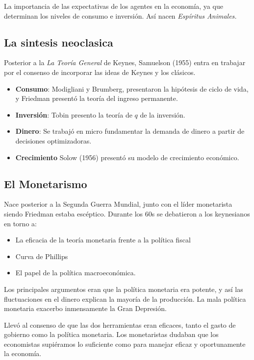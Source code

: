 La importancia de las expectativas de los agentes en la economía, ya que determinan los niveles de consumo e inversión. Así nacen \textit{Espíritus Animales.}

\subsection{La sintesis neoclasica}

Posterior a la \textit{La Teoría General} de Keynes, Samuelson (1955) entra en trabajar por el consenso de incorporar las ideas de Keynes y los clásicos. 

\begin{itemize}
    \item \textbf{Consumo}: Modigliani y Brumberg, presentaron la hipótesis de ciclo de vida, y Friedman presentó la teoría del ingreso permanente.
    \item \textbf{Inversión}: Tobin presento la teoría de $q$ de la inversión.
    \item \textbf{Dinero}: Se trabajó en micro fundamentar la demanda de dinero a partir de decisiones optimizadoras.
    \item \textbf{Crecimiento} Solow (1956) presentó su modelo de crecimiento económico.
\end{itemize}

\subsection{El Monetarismo}

Nace posterior a la Segunda Guerra Mundial, junto con el líder monetarista siendo Friedman estaba escéptico. Durante los 60s se debatieron a los keynesianos en torno a:
\begin{itemize}
    \item La eficacia de la teoría monetaria frente a la política fiscal
    \item Curva de Phillips
    \item El papel de la política macroeconómica. 
\end{itemize}

Los principales argumentos eran que la política monetaria era potente, y así las fluctuaciones en el dinero explican la mayoría de la producción. La mala política monetaria exacerbo inmensamente la Gran Depresión.

Llevó al consenso de que las dos herramientas eran eficaces, tanto el gasto de gobierno como la política monetaria. Los monetaristas dudaban que los economistas supiéramos lo suficiente como para manejar eficaz y oportunamente la economía.

